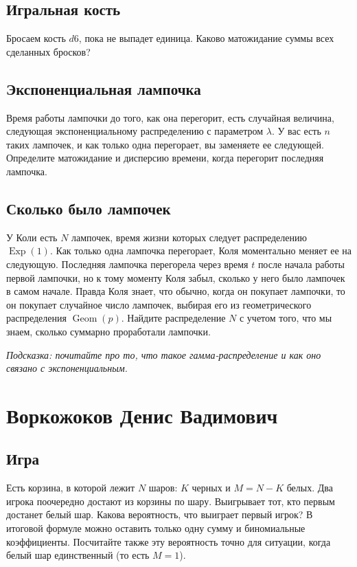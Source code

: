 \documentclass[12pt]{article}
\DeclareMathOperator{\Geom}{Geom}
\DeclareMathOperator{\Exp}{Exp}
\begin{document}
\subsection{Игральная кость}Бросаем кость $d6$, пока не выпадет единица. Каково матожидание суммы всех сделанных бросков?

\subsection{Экспоненциальная лампочка}
Время работы лампочки до того, как она перегорит, есть случайная величина, следующая экспоненциальному распределению с параметром $\lambda$. У вас есть $n$ таких лампочек, и как только одна перегорает, вы заменяете ее следующей. Определите матожидание и дисперсию времени, когда перегорит последняя лампочка.

\subsection{Сколько было лампочек}
У Коли есть $N$ лампочек, время жизни которых следует распределению $\Exp(1)$. Как только одна лампочка перегорает, Коля моментально меняет ее на следующую. Последняя лампочка перегорела через время $t$ после начала работы первой лампочки, но к тому моменту Коля забыл, сколько у него было лампочек в самом начале. Правда Коля знает, что обычно, когда он покупает лампочки, то он покупает случайное число лампочек, выбирая его из геометрического распределения $\Geom(p)$. Найдите распределение $N$ с учетом того, что мы знаем, сколько суммарно проработали лампочки. 

\emph{Подсказка: почитайте про то, что такое гамма-распределение и как оно связано с экспоненциальным.}

\newpage
\section{Воркожоков Денис Вадимович}

\subsection{Игра}
Есть корзина, в которой лежит $N$ шаров: $K$ черных и $M = N - K$ белых. Два игрока поочередно достают из корзины по шару. Выигрывает тот, кто первым достанет белый шар. Какова вероятность, что выиграет первый игрок? В итоговой формуле можно оставить только одну сумму и биномиальные коэффициенты. Посчитайте также эту вероятность точно для ситуации, когда белый шар единственный (то есть $M = 1$).
\end{document}
